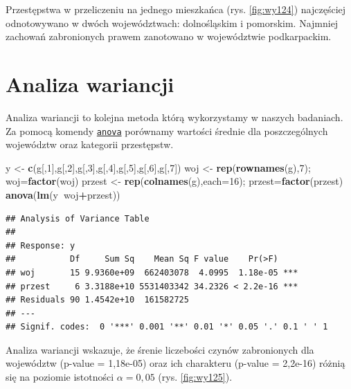 \documentclass[polish,]{book}
\newenvironment{Shaded}{\begin{snugshade}}{\end{snugshade}}
\newcommand{\DataTypeTok}[1]{\textcolor[rgb]{0.13,0.29,0.53}{#1}}
\newcommand{\DecValTok}[1]{\textcolor[rgb]{0.00,0.00,0.81}{#1}}
\newcommand{\KeywordTok}[1]{\textcolor[rgb]{0.13,0.29,0.53}{\textbf{#1}}}
\newcommand{\NormalTok}[1]{#1}
\newcommand{\OperatorTok}[1]{\textcolor[rgb]{0.81,0.36,0.00}{\textbf{#1}}}
\newcommand{\StringTok}[1]{\textcolor[rgb]{0.31,0.60,0.02}{#1}}
\begin{document}
Przestępstwa w przeliczeniu na jednego mieszkańca (rys. \ref{fig:wy124}) najczęściej odnotowywano w dwóch województwach: dolnośląskim i pomorskim. Najmniej zachowań zabronionych prawem zanotowano w województwie podkarpackim.

\hypertarget{part_12.3}{%
\section{Analiza wariancji}\label{part_12.3}}

Analiza wariancji to kolejna metoda którą wykorzystamy w naszych badaniach.
Za pomocą komendy \href{https://rdrr.io/r/stats/anova.html}{\texttt{anova}} porównamy wartości średnie dla poszczególnych województw oraz kategorii przestępstw.

\begin{Shaded}
\begin{Highlighting}[]
\NormalTok{y <-}\StringTok{ }\KeywordTok{c}\NormalTok{(g[,}\DecValTok{1}\NormalTok{],g[,}\DecValTok{2}\NormalTok{],g[,}\DecValTok{3}\NormalTok{],g[,}\DecValTok{4}\NormalTok{],g[,}\DecValTok{5}\NormalTok{],g[,}\DecValTok{6}\NormalTok{],g[,}\DecValTok{7}\NormalTok{])}
\NormalTok{woj <-}\StringTok{ }\KeywordTok{rep}\NormalTok{(}\KeywordTok{rownames}\NormalTok{(g),}\DecValTok{7}\NormalTok{); woj=}\KeywordTok{factor}\NormalTok{(woj)}
\NormalTok{przest <-}\StringTok{ }\KeywordTok{rep}\NormalTok{(}\KeywordTok{colnames}\NormalTok{(g),}\DataTypeTok{each=}\DecValTok{16}\NormalTok{); przest=}\KeywordTok{factor}\NormalTok{(przest)}
\KeywordTok{anova}\NormalTok{(}\KeywordTok{lm}\NormalTok{(y}\OperatorTok{~}\NormalTok{woj}\OperatorTok{+}\NormalTok{przest))}
\end{Highlighting}
\end{Shaded}

\begin{verbatim}
## Analysis of Variance Table
## 
## Response: y
##           Df     Sum Sq    Mean Sq F value    Pr(>F)    
## woj       15 9.9360e+09  662403078  4.0995  1.18e-05 ***
## przest     6 3.3188e+10 5531403342 34.2326 < 2.2e-16 ***
## Residuals 90 1.4542e+10  161582725                      
## ---
## Signif. codes:  0 '***' 0.001 '**' 0.01 '*' 0.05 '.' 0.1 ' ' 1
\end{verbatim}

Analiza wariancji wskazuje, że śrenie liczebości czynów zabronionych dla województw (p-value = 1,18e-05) oraz ich charakteru (p-value = 2,2e-16) różnią się na poziomie istotności \(\alpha = 0,05\) (rys. \ref{fig:wy125}).
\end{document}
